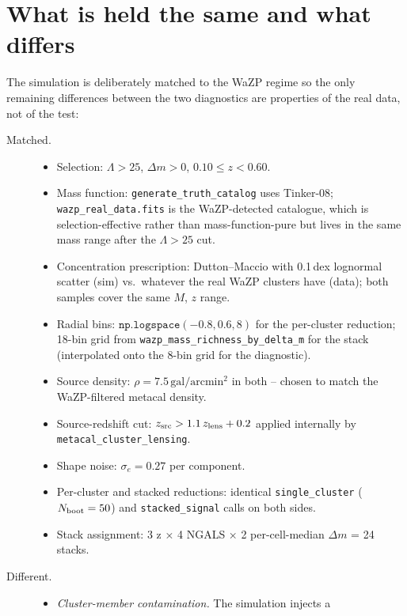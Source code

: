 \documentclass[11pt,a4paper]{article}
\begin{document}
\section{What is held the same and what differs}
\label{sec:diff}

The simulation is deliberately matched to the WaZP regime so the only
remaining differences between the two diagnostics are properties of
the real data, not of the test:

\begin{description}
\item[Matched.]
\begin{itemize}
\item Selection: $\Lambda > 25$, $\Delta m > 0$, $0.10 \le z < 0.60$.
\item Mass function: \texttt{generate\_truth\_catalog} uses Tinker-08;
      \texttt{wazp\_real\_data.fits} is the WaZP-detected catalogue,
      which is selection-effective rather than mass-function-pure but
      lives in the same mass range after the $\Lambda > 25$ cut.
\item Concentration prescription: Dutton--Maccio with 0.1\,dex
      lognormal scatter (sim) vs.\ whatever the real WaZP clusters
      have (data); both samples cover the same $M$, $z$ range.
\item Radial bins: $\mathtt{np.logspace}(-0.8, 0.6, 8)$ for the
      per-cluster reduction; 18-bin grid from
      \texttt{wazp\_mass\_richness\_by\_delta\_m} for the stack
      (interpolated onto the 8-bin grid for the diagnostic).
\item Source density: $\rho = 7.5\,\mathrm{gal}/\mathrm{arcmin}^{2}$
      in both -- chosen to match the WaZP-filtered metacal density.
\item Source-redshift cut: $z_{\rm src} > 1.1\,z_{\rm lens} + 0.2$
      applied internally by \texttt{metacal\_cluster\_lensing}.
\item Shape noise: $\sigma_e = 0.27$ per component.
\item Per-cluster and stacked reductions: identical
      \texttt{single\_cluster} ($N_{\rm boot}=50$) and
      \texttt{stacked\_signal} calls on both sides.
\item Stack assignment: 3 z × 4 NGALS × 2 per-cell-median $\Delta m$ = 24
      stacks.
\end{itemize}
\item[Different.]
\begin{itemize}
\item \emph{Cluster-member contamination.}  The simulation injects a

\end{itemize}
\end{description}
\end{document}
